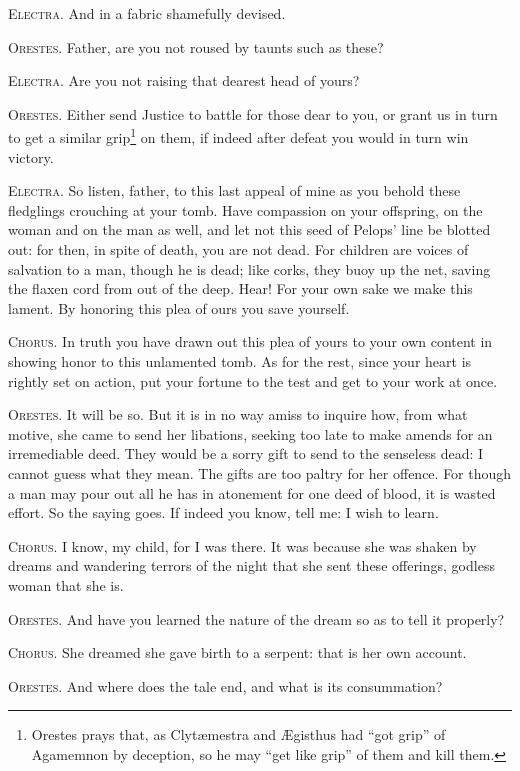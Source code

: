 \documentclass[12pt]{article}
\begin{document}
\textsc{Electra.} And in a fabric shamefully devised.

\textsc{Orestes.} Father, are you not roused by taunts such as these?

\textsc{Electra.} Are you not raising that dearest head of yours?

\textsc{Orestes.} Either send Justice to battle for those dear to you, or grant us in turn to get a similar grip\footnote{Orestes prays that, as Clyt{\ae}mestra and {\AE}gisthus had ``got grip'' of Agamemnon by deception, so he may ``get like grip'' of them and kill them.} on them, if indeed after defeat you would in turn win victory.

\textsc{Electra.} So listen, father, to this last appeal of mine as you behold these fledglings crouching at your tomb. Have compassion on your offspring, on the woman and on the man as well, and let not this seed of Pelops' line be blotted out: for then, in spite of death, you are not dead. For children are voices of salvation to a man, though he is dead; like corks, they buoy up the net, saving the flaxen cord from out of the deep. Hear! For your own sake we make this lament. By honoring this plea of ours you save yourself.

\textsc{Chorus.} In truth you have drawn out this plea of yours to your own content in showing honor to this unlamented tomb. As for the rest, since your heart is rightly set on action, put your fortune to the test and get to your work at once.

\textsc{Orestes.} It will be so. But it is in no way amiss to inquire how, from what motive, she came to send her libations, seeking too late to make amends for an irremediable deed. They would be a sorry gift to send to the senseless dead: I cannot guess what they mean. The gifts are too paltry for her offence. For though a man may pour out all he has in atonement for one deed of blood, it is wasted effort. So the saying goes. If indeed you know, tell me: I wish to learn.

\textsc{Chorus.} I know, my child, for I was there. It was because she was shaken by dreams and wandering terrors of the night that she sent these offerings, godless woman that she is.

\textsc{Orestes.} And have you learned the nature of the dream so as to tell it properly?

\textsc{Chorus.} She dreamed she gave birth to a serpent: that is her own account.

\textsc{Orestes.} And where does the tale end, and what is its consummation?
\end{document}
